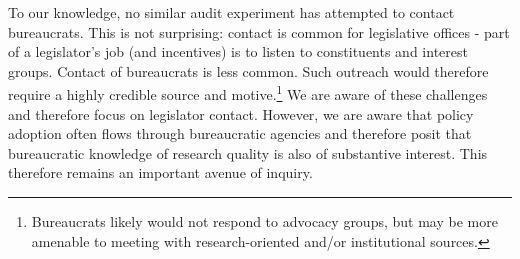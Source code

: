 \documentclass[12pt,final,fleqn]{article}
\theoremstyle{plain}
\begin{document}
To our knowledge, no similar audit experiment has attempted to contact bureaucrats. This is not surprising: contact is common for legislative offices -  part of a legislator's job (and incentives) is to listen to constituents and interest groups. Contact of bureaucrats is less common. Such outreach would therefore require a highly credible source and motive.\footnote{Bureaucrats likely would not respond to advocacy groups, but may be more amenable to meeting with research-oriented and/or institutional sources.} We are aware of these challenges and therefore focus on legislator contact. However, we are aware that policy adoption often flows through bureaucratic agencies and therefore posit that bureaucratic knowledge of research quality is also of substantive interest. This therefore remains an important avenue of inquiry.
\end{document}
